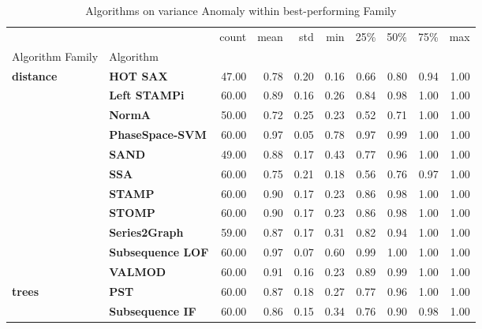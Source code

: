 \begin{table}
\caption{Algorithms on variance Anomaly within best-performing Family}
\label{tab:bp-variance}
\begin{tabular}{llrrrrrrrr}
\toprule
 &  & count & mean & std & min & 25\% & 50\% & 75\% & max \\
Algorithm Family & Algorithm &  &  &  &  &  &  &  &  \\
\midrule
\multirow[t]{11}{*}{\textbf{distance}} & \textbf{HOT SAX} & 47.00 & 0.78 & 0.20 & 0.16 & 0.66 & 0.80 & 0.94 & 1.00 \\
\textbf{} & \textbf{Left STAMPi} & 60.00 & 0.89 & 0.16 & 0.26 & 0.84 & 0.98 & 1.00 & 1.00 \\
\textbf{} & \textbf{NormA} & 50.00 & 0.72 & 0.25 & 0.23 & 0.52 & 0.71 & 1.00 & 1.00 \\
\textbf{} & \textbf{PhaseSpace-SVM} & 60.00 & 0.97 & 0.05 & 0.78 & 0.97 & 0.99 & 1.00 & 1.00 \\
\textbf{} & \textbf{SAND} & 49.00 & 0.88 & 0.17 & 0.43 & 0.77 & 0.96 & 1.00 & 1.00 \\
\textbf{} & \textbf{SSA} & 60.00 & 0.75 & 0.21 & 0.18 & 0.56 & 0.76 & 0.97 & 1.00 \\
\textbf{} & \textbf{STAMP} & 60.00 & 0.90 & 0.17 & 0.23 & 0.86 & 0.98 & 1.00 & 1.00 \\
\textbf{} & \textbf{STOMP} & 60.00 & 0.90 & 0.17 & 0.23 & 0.86 & 0.98 & 1.00 & 1.00 \\
\textbf{} & \textbf{Series2Graph} & 59.00 & 0.87 & 0.17 & 0.31 & 0.82 & 0.94 & 1.00 & 1.00 \\
\textbf{} & \textbf{Subsequence LOF} & 60.00 & 0.97 & 0.07 & 0.60 & 0.99 & 1.00 & 1.00 & 1.00 \\
\textbf{} & \textbf{VALMOD} & 60.00 & 0.91 & 0.16 & 0.23 & 0.89 & 0.99 & 1.00 & 1.00 \\
\cline{1-10}
\multirow[t]{2}{*}{\textbf{trees}} & \textbf{PST} & 60.00 & 0.87 & 0.18 & 0.27 & 0.77 & 0.96 & 1.00 & 1.00 \\
\textbf{} & \textbf{Subsequence IF} & 60.00 & 0.86 & 0.15 & 0.34 & 0.76 & 0.90 & 0.98 & 1.00 \\
\cline{1-10}
\bottomrule
\end{tabular}
\end{table}
